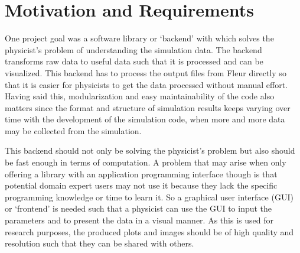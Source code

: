 


\section{Motivation and Requirements}
\label{sec:motiv-requ}

One project goal was a software library or `backend' with which solves the
physicist's problem of understanding the simulation data. The backend transforms
raw data to useful data such that it is processed and can be visualized. This
backend has to process the output files from Fleur directly so that it is easier
for physicists to get the data processed without manual effort. Having said
this, modularization and easy maintainability of the code also matters since the
format and structure of simulation results keeps varying over time with the
development of the simulation code, when more and more data may be collected
from the simulation.

This backend should not only be solving the physicist's problem but also should
be fast enough in terms of computation. A problem that may arise when only
offering a library with an application programming interface though is that
potential domain expert users may not use it because they lack the specific
programming knowledge or time to learn it. So a graphical user interface (GUI)
or `frontend' is needed such that a physicist can use the GUI to input the
parameters and to present the data in a visual manner. As this is used for
research purposes, the produced plots and images should be of high quality and
resolution such that they can be shared with others.

